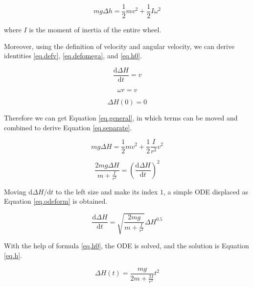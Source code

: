 \documentclass[a4paper]{article}
\begin{document}
\begin{equation}
    mg\Delta h = \frac{1}{2}m v^2 + \frac{1}{2} I \omega ^2
\end{equation}

where $I$ is the moment of inertia of the entire wheel. 

Moreover, using the definition of velocity and angular velocity, we can derive identities \ref{eq.defv}, \ref{eq.defomega}, and \ref{eq.h0}.

\begin{equation}\label{eq.defv}
    \dfrac{\mathrm{d}\Delta H}{\mathrm{d}t} = v
\end{equation}

\begin{equation}\label{eq.defomega}
    \omega r = v
\end{equation}

\begin{equation}\label{eq.h0}
    \Delta H(0) = 0
\end{equation}

Therefore we can get Equation \ref{eq.general}, in which terms can be moved and combined to derive Equation \ref{eq.separate}.

\begin{equation}\label{eq.general}
    mg\Delta H = \frac{1}{2}m v^2 + \frac{1}{2} \frac{I}{r^2} v ^2
\end{equation}

\begin{equation}\label{eq.separate}
    \frac{2mg\Delta H}{m+\frac{I}{r^2}} = (\dfrac{\mathrm{d}\Delta H}{\mathrm{d}t})^2
\end{equation}

Moving ${\mathrm{d}\Delta H}/{\mathrm{d}t}$ to the left size and make its index $1$, a simple ODE displaced as Equation \ref{eq.odeform} is obtained.

\begin{equation}\label{eq.odeform}
    \dfrac{\mathrm{d}\Delta H}{\mathrm{d}t} = \sqrt{\frac{2mg}{m+\frac{I}{r^2}}} \Delta H ^ {0.5}
\end{equation}

With the help of formula \ref{eq.h0}, the ODE is solved, and the solution is Equation \ref{eq.h}.

\begin{equation}\label{eq.h}
    \Delta H(t) = \dfrac{mg}{2m+\frac{2I}{r^2}} t^2
\end{equation}
\end{document}
